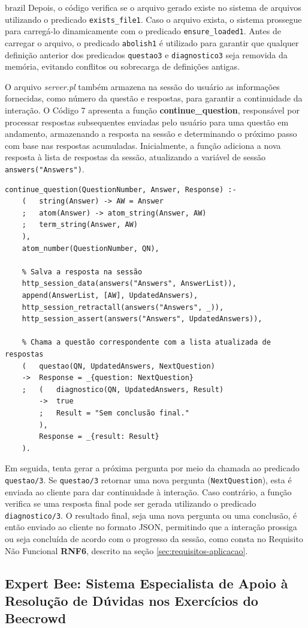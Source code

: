 \begin{otherlanguage*}{brazil}
Depois, o código verifica se o arquivo gerado existe no sistema de arquivos utilizando o predicado \texttt{exists\_file\/1}. Caso o arquivo exista, o sistema prossegue para carregá-lo dinamicamente com o predicado \texttt{ensure\_loaded\/1}. Antes de carregar o arquivo, o predicado \texttt{abolish\/1} é utilizado para garantir que qualquer definição anterior dos predicados \texttt{questao\/3} e \texttt{diagnostico\/3} seja removida da memória, evitando conflitos ou sobrecarga de definições antigas.


O arquivo \textit{server.pl} também armazena na sessão do usuário as informações fornecidas, como número da questão e respostas, para garantir a continuidade da interação. O Código 7 apresenta a função \textbf{continue\_question}, responsável por processar respostas subsequentes enviadas pelo usuário para uma questão em andamento, armazenando a resposta na sessão e determinando o próximo passo com base nas respostas acumuladas. Inicialmente, a função adiciona a nova resposta à lista de respostas da sessão, atualizando a variável de sessão \texttt{answers("Answers")}. 

\begin{lstlisting}[style=ufscthesisx_style, caption={Arquivo \textit{server.pl} - \textit{Handlers} e Manipuladores de requisições}]
continue_question(QuestionNumber, Answer, Response) :-
    (   string(Answer) -> AW = Answer
    ;   atom(Answer) -> atom_string(Answer, AW)
    ;   term_string(Answer, AW)
    ),
    atom_number(QuestionNumber, QN), 

    % Salva a resposta na sessão
    http_session_data(answers("Answers", AnswerList)),
    append(AnswerList, [AW], UpdatedAnswers),
    http_session_retractall(answers("Answers", _)),
    http_session_assert(answers("Answers", UpdatedAnswers)),

    % Chama a questão correspondente com a lista atualizada de respostas
    (   questao(QN, UpdatedAnswers, NextQuestion)
    ->  Response = _{question: NextQuestion}
    ;   (   diagnostico(QN, UpdatedAnswers, Result)
        ->  true
        ;   Result = "Sem conclusão final."
        ),
        Response = _{result: Result}
    ).
\end{lstlisting}

Em seguida, tenta gerar a próxima pergunta por meio da chamada ao predicado \texttt{questao/3}. Se \texttt{questao/3} retornar uma nova pergunta (\texttt{NextQuestion}), esta é enviada ao cliente para dar continuidade à interação. Caso contrário, a função verifica se uma resposta final pode ser gerada utilizando o predicado \texttt{diagnostico/3}. O resultado final, seja uma nova pergunta ou uma conclusão, é então enviado ao cliente no formato JSON, permitindo que a interação prossiga ou seja concluída de acordo com o progresso da sessão, como consta no Requisito Não Funcional \textbf{RNF6}, descrito na seção \ref{sec:requisitos-aplicacao}.

\subsection{Expert Bee: Sistema Especialista de Apoio à Resolução de Dúvidas nos Exercícios do Beecrowd}

\end{otherlanguage*}

